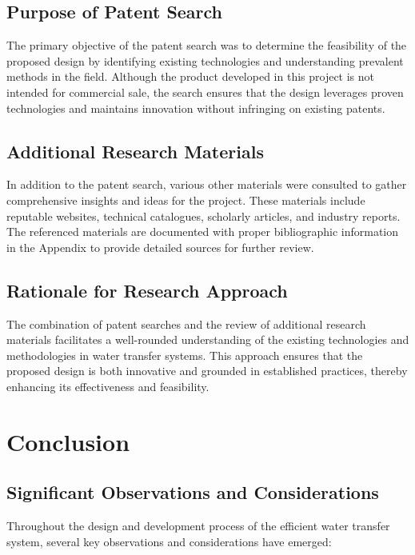 \documentclass[12pt]{report}
\begin{document}
\subsection{Purpose of Patent Search}
The primary objective of the patent search was to determine the feasibility of the proposed design by identifying existing technologies and understanding prevalent methods in the field. Although the product developed in this project is not intended for commercial sale, the search ensures that the design leverages proven technologies and maintains innovation without infringing on existing patents.

\subsection{Additional Research Materials}
In addition to the patent search, various other materials were consulted to gather comprehensive insights and ideas for the project. These materials include reputable websites, technical catalogues, scholarly articles, and industry reports. The referenced materials are documented with proper bibliographic information in the Appendix to provide detailed sources for further review.

\subsection{Rationale for Research Approach}
The combination of patent searches and the review of additional research materials facilitates a well-rounded understanding of the existing technologies and methodologies in water transfer systems. This approach ensures that the proposed design is both innovative and grounded in established practices, thereby enhancing its effectiveness and feasibility.

\section{Conclusion}

\subsection{Significant Observations and Considerations}

Throughout the design and development process of the efficient water transfer system, several key observations and considerations have emerged:
\end{document}
